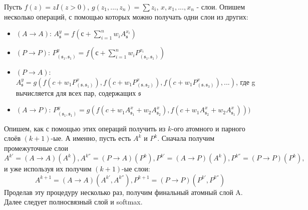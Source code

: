 \documentclass[12pt,twoside]{article}
\begin{document}
	Пусть $f(z) = z I(z > 0)$, $g(z_1,..., z_n) = \sum{z_i}$, $x, x_1,...,x_n$ - слои. Опишем несколько операций, с помощью которых можно получать одни слои из других:
	\begin{itemize}
	\item $(A\to A)$: $A^y_\mathfrak{s} = f(с+\sum_{i=1}^n {w_i A^{x_i}_\mathfrak{s}})$
	\item $(P\to P)$: $P^y_{(\mathfrak{s}_1, \mathfrak{s}_1)} = f(с+\sum_{i=1}^n {w_i P^{x_i}_{(\mathfrak{s}_1, \mathfrak{s}_1)}})$
	\item $(P\to A)$: $A^y_\mathfrak{s} = g(f(c + w_1 P^x_{(\mathfrak{s}, \mathfrak{s}_1)}), f(c + w_1 P^x_{(\mathfrak{s}, \mathfrak{s}_2)}), f(c + w_1 P^x_{(\mathfrak{s}, \mathfrak{s}_3)}),...)$, где g вычисляется для всех пар, содержащих $\mathfrak{s}$
	\item $(A\rightarrow P)$: $P^y_{(\mathfrak{s}_1, \mathfrak{s}_1)} = g(f(c + w_1 A^x_{\mathfrak{s}_1} + w_2 A^x_{\mathfrak{s}_2}), f(c + w_1 A^x_{\mathfrak{s}_2} + w_2 A^x_{\mathfrak{s}_1})))$
	\end{itemize}
	
	Опишем, как с помощью этих операций получить из $k$-ого атомного и парного слоёв $(k+1)$-ые. А именно, пусть есть $A^k$ и $P^k$. Сначала получим промежуточные слои $$A^{k'} = (A\to A)(A^k), A^{k''}=(P\to A)(P^k), P^{k'}=(A \to P)(A^k), P^{k''}=(P\to P)(P^k),$$ и уже используя их получим $(k+1)$-ые слои: $$A^{k+1} = (A\to A)(A^{k'}, A^{k''}), P^{k+1} = (P\to P)(P^{k'}, P^{k''})$$
	Проделав эту процедуру несколько раз, получим финальный атомный слой A. Далее следует полносвязный слой и softmax.
\end{document}
